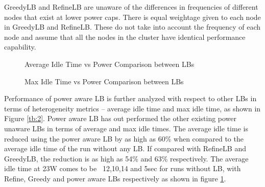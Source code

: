 GreedyLB and RefineLB are unaware of the differences in frequencies of
different nodes that exist at lower power caps. There is equal weightage given
to each node in GreedyLB and RefineLB. These do not take into account the
frequency of each node and assume that all the nodes in the cluster have
identical performance capability.


\begin{figure}
\centering
\caption{Average Idle Time vs Power Comparison between LBs}
\label{fig:avg_times_final_vs_power}
\end{figure}

\begin{figure}
\centering
\caption{Max Idle Time vs Power Comparison between LBs}
\label{fig:idle_times_final_vs_power}
\end{figure}


Performance of power aware LB is further analyzed with respect to other LBs in
terms of heterogeneity metrics – average idle time and max idle time, as shown
in Figure \ref{tb:2}. Power aware LB has out performed the other existing power
unaware LBs in terms of average and max idle times. The average idle time is
reduced using the power aware LB by as high as 60\% when compared to the
average idle time of the run without any LB. If compared with RefineLB and
GreedyLB, the reduction is as high as 54\% and 63\% respectively. The average
idle time at 23W comes to be ~12,10,14 and 5sec for runs without LB, with
Refine, Greedy and power aware LBs respectively as shown in figure
\ref{fig:avg_times_final_vs_power}.

